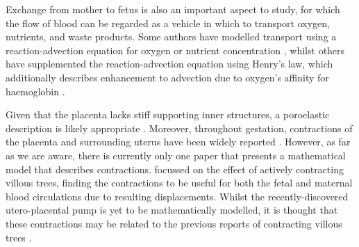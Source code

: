         Exchange from mother to fetus is also an important aspect to study, for which the flow of blood can be regarded as a vehicle in which to transport oxygen, nutrients, and waste products. Some authors have modelled transport using a reaction-advection equation for oxygen or nutrient concentration \cite{perazzoloModellingEffectIntervillous2017,perazzoloModellingNutrientTransfer2016,chernyavskyMathematicalModelIntervillous2010}, whilst others have supplemented the reaction-advection equation using Henry's law, which additionally describes enhancement to advection due to oxygen's affinity for haemoglobin \cite{serovOptimalVilliDensity2015,erlichPhysicalGeometricDeterminants2019,pearceImageBasedModelingBlood2016,meklerImpactTissuePorosity2022,serovOptimalVilliDensity2015,pearceImageBasedModelingBlood2016}.

        Given that the placenta lacks stiff supporting inner structures, a poroelastic description is likely appropriate \cite{jensenBloodFlowTransport2019}. Moreover, throughout gestation, contractions of the placenta and surrounding uterus have been widely reported \cite{dellschaftHaemodynamicsHumanPlacenta2020,togashiSustainedUterineContractions1993,farleyContractilePropertiesHuman2004}. However, as far as we are aware, there is currently only one paper that presents a mathematical model that describes contractions. \citeauthor{katoVillousTreeModel2017} \cite{katoVillousTreeModel2017} focussed on the effect of actively contracting villous trees, finding the contractions to be useful for both the fetal and maternal blood circulations due to resulting displacements. Whilst the recently-discovered utero-placental pump is yet to be mathematically modelled, it is thought that these contractions may be related to the previous reports of contracting villous trees \cite{dellschaftHaemodynamicsHumanPlacenta2020}.

